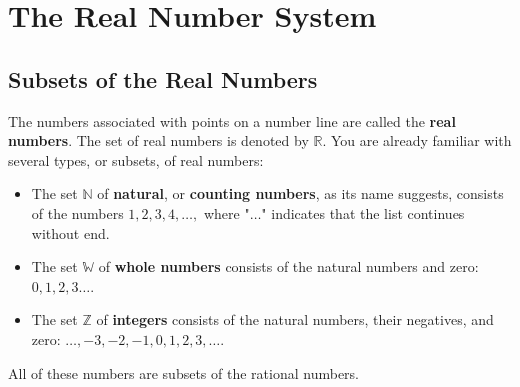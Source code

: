 \documentclass[10pt,]{book}
\newcommand{\terminology}[1]{\textbf{#1}}
\theoremstyle{plain}
\theoremstyle{definition}
\theoremstyle{definition}
\theoremstyle{definition}
\numberwithin{equation}{part}
\begin{document}
\section[{The Real Number System}]{The Real Number System}\label{appendix-The-Real-Number-System}
\typeout{************************************************}
\typeout{************************************************}
\subsection[{Subsets of the Real Numbers}]{Subsets of the Real Numbers}\label{subsection-59}
The numbers associated with points on a number line are called the \terminology{real numbers}. The set of real numbers is denoted by \(\mathbb{R}\). You are already familiar with several types, or subsets, of real numbers: \leavevmode%
\begin{itemize}[label=\textbullet]
\item{}The set \(\mathbb{N} \) of \terminology{natural}, or \terminology{counting numbers}, as its name suggests, consists of the numbers \(1, 2, 3, 4 , \ldots ,\) where "\(\ldots\)" indicates that the list continues without end.%
\item{}The set \(\mathbb{W} \) of \terminology{whole numbers} consists of the natural numbers and zero: \(0, 1, 2, 3 \ldots\).%
\item{}The set \(\mathbb{Z} \) of \terminology{integers} consists of the natural numbers, their negatives, and zero: \(\ldots , −3, −2, −1, 0, 1, 2, 3, \ldots\).%
\end{itemize}
 All of these numbers are subsets of the rational numbers.%
\typeout{************************************************}
\typeout{************************************************}
\end{document}
